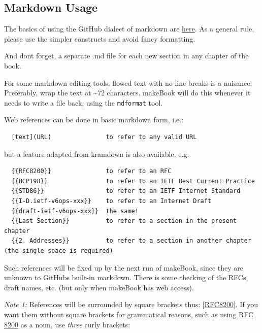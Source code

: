 \documentclass[
]{article}
\begin{document}
\pagebreak

\subsection{Markdown Usage}\label{markdown-usage}

The basics of using the GitHub dialect of markdown are
\href{https://docs.github.com/en/get-started/writing-on-github/getting-started-with-writing-and-formatting-on-github/basic-writing-and-formatting-syntax}{here}.
As a general rule, please use the simpler constructs and avoid fancy
formatting.

And don\textquotesingle t forget, a separate .md file for each new
section in any chapter of the book.

For some markdown editing tools, flowed text with no line breaks is a
nuisance. Preferably, wrap the text at \textasciitilde72 characters.
makeBook will do this whenever it needs to write a file back, using the
\texttt{mdformat} tool.

Web references can be done in basic markdown form, i.e.:

\begin{verbatim}
  [text](URL)               to refer to any valid URL
\end{verbatim}

but a feature adapted from kramdown is also available, e.g.

\begin{verbatim}
  {{RFC8200}}               to refer to an RFC
  {{BCP198}}                to refer to an IETF Best Current Practice
  {{STD86}}                 to refer to an IETF Internet Standard
  {{I-D.ietf-v6ops-xxx}}    to refer to an Internet Draft
  {{draft-ietf-v6ops-xxx}}  the same!
  {{Last Section}}          to refer to a section in the present chapter
  {{2. Addresses}}          to refer to a section in another chapter  (the single space is required) 
\end{verbatim}

Such references will be fixed up by the next run of makeBook, since they
are unknown to GitHub\textquotesingle s built-in markdown. There is some
checking of the RFCs, draft names, etc. (but only when makeBook has web
access).

\emph{Note 1:} References will be surrounded by square brackets thus:
{[}\href{https://www.rfc-editor.org/info/rfc8200}{RFC8200}{]}. If you
want them without square brackets for grammatical reasons, such as using
\href{https://www.rfc-editor.org/info/rfc8200}{RFC 8200} as a noun, use
\emph{three} curly brackets:
\end{document}
